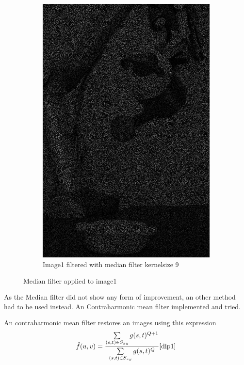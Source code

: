 \begin{figure}[H]
\begin{subfigure}[b]{0.27\textwidth}
        \includegraphics[width=\textwidth]{img1/img_1_medianBlur_9.png}
        \caption{Image1 filtered with median filter kernelsize 9}
        \label{fig:img1_median9}
    \end{subfigure}
    \caption{Median filter applied to image1}\label{fig:img_median_full}
\end{figure}

As the Median filter did not show  any form of improvement, an other method had to be used instead.  An Contraharmonic mean filter implemented and tried.  

An contraharmonic mean filter restores an images using this expression
\begin{equation}
\hat{f}(u,v) = \frac{\sum\limits_{(s,t) \in S_{xy}}g(s,t)^{Q+1}}{\sum\limits_{(s,t) \in S_{xy}}g(s,t)^{Q}}
\cite{dip1}
\label{eq:Contra}
\end{equation}

